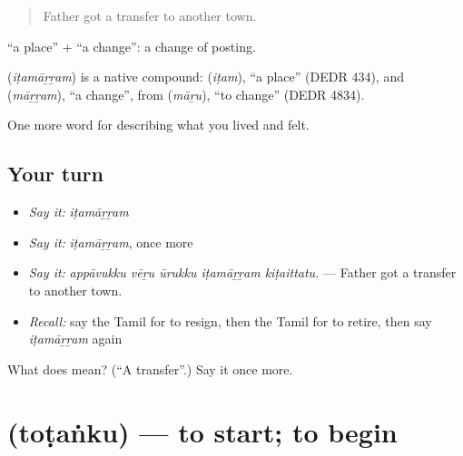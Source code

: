 \begin{quote}
Father got a transfer to another town.
\end{quote}

 \textquotedblleft{}a place\textquotedblright{} +  \textquotedblleft{}a change\textquotedblright{}: a change of posting.

\begin{cousinweb}
\textbf{} (\emph{iṭamāṟṟam}) is a native compound:  (\emph{iṭam}), \textquotedblleft{}a place\textquotedblright{} (DEDR 434), and  (\emph{māṟṟam}), \textquotedblleft{}a change\textquotedblright{}, from  (\emph{māṟu}), \textquotedblleft{}to change\textquotedblright{} (DEDR 4834).
\end{cousinweb}

\begin{grammarlens}[title={What you've built}]
One more word for describing what you lived and felt.
\end{grammarlens}

\subsection*{Your turn}
\begin{itemize}
\raggedright
  \item \emph{Say it:} \emph{iṭamāṟṟam}
  \item \emph{Say it:} \emph{iṭamāṟṟam}, once more
  \item \emph{Say it:} \emph{appāvukku vēṟu ūrukku iṭamāṟṟam kiṭaittatu.} — Father got a transfer to another town.
  \item \emph{Recall:} say the Tamil for to resign, then the Tamil for to retire, then say \emph{iṭamāṟṟam} again
\end{itemize}

\begin{tcolorbox}[breakable,colback=teal!4,colframe=teal!35!black,title={Before you move on}]
What does  mean? (\textquotedblleft{}A transfer\textquotedblright{}.) Say it once more.
\end{tcolorbox}
\section[\texorpdfstring{\ta{தொடங்கு} (toṭaṅku)}{தொடங்கு (toṭaṅku)}]{ (toṭaṅku) — to start; to begin}

\label{lesson:TA-C512-totanku}



